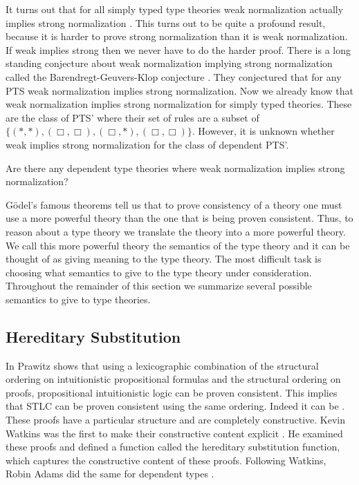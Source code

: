 It turns out that for all simply typed type theories weak
normalization actually implies strong normalization
\cite{Sorensen:1997}.  This turns out to be quite a profound result,
because it is harder to prove strong normalization than it is weak
normalization.  If weak implies strong then we never have to do the
harder proof.  There is a long standing conjecture about weak
normalization implying strong normalization called the
Barendregt-Geuvers-Klop conjecture \cite{Sorensen:2006}.  They
conjectured that for any PTS weak normalization implies strong
normalization.  Now we already know that weak normalization implies
strong normalization for simply typed theories.  These are the class
of PTS' where their set of rules are a subset of
$\{(*,*),(\Box,\Box),(\Box,*),(\Box,\Box)\}$.  However, it is unknown
whether weak implies strong normalization for the class of dependent
PTS'.
\begin{openproblem}
  Are there any dependent type theories where weak normalization
  implies strong normalization?
\end{openproblem}

G\"odel's famous theorems tell us that to prove consistency of a
theory one must use a more powerful theory than the one that is being
proven consistent.  Thus, to reason about a type theory we translate
the theory into a more powerful theory.  We call this more powerful
theory the semantics of the type theory and it can be thought of as
giving meaning to the type theory.  The most difficult task is
choosing what semantics to give to the type theory under
consideration.  Throughout the remainder of this section we summarize
several possible semantics to give to type theories.  

\subsection{Hereditary Substitution}
\label{subsec:hereditary_substitution}
In \cite{Prawitz:1965} Prawitz shows that using a lexicographic
combination of the structural ordering on intuitionistic propositional
formulas and the structural ordering on proofs, propositional
intuitionistic logic can be proven consistent.  This implies that STLC
can be proven consistent using the same ordering.  Indeed it can be
\cite{Girard:1989,Amadio:1998,Levy:1976}.  These proofs have a
particular structure and are completely constructive.  Kevin Watkins
was the first to make their constructive content explicit
\cite{Watkins:2004}.  He examined these proofs and defined a function
called the hereditary substitution function, which captures the
constructive content of these proofs.  Following Watkins, Robin Adams
did the same for dependent types \cite{Adams:2004}.


